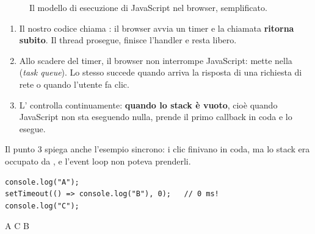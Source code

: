 \begin{figure}[H]
\caption{Il modello di esecuzione di JavaScript nel browser, semplificato.}
\end{figure}

\begin{enumerate}
  \item Il nostro codice chiama : il browser avvia un
        timer e la chiamata \textbf{ritorna subito}. Il thread prosegue, finisce
        l'handler e resta libero.
  \item Allo scadere del timer, il browser non interrompe JavaScript: mette
         nella  (\textit{task queue}). Lo
        stesso succede quando arriva la risposta di una richiesta di rete o
        quando l'utente fa clic.
  \item L' controlla continuamente: \textbf{quando lo stack è
        vuoto}, cioè quando JavaScript non sta eseguendo nulla, prende il primo
        callback in coda e lo esegue.
\end{enumerate}

Il punto 3 spiega anche l'esempio sincrono: i clic finivano in coda, ma lo stack
era occupato da , e l'event loop non poteva prenderli.

\begin{affianco}[0.5][c]
\begin{lstlisting}[style=js, name=timeout-zero.js]
console.log("A");
setTimeout(() => console.log("B"), 0);   // 0 ms!
console.log("C");
\end{lstlisting}
\risultato
\begin{console}
A
C
B
\end{console}
\end{affianco}


